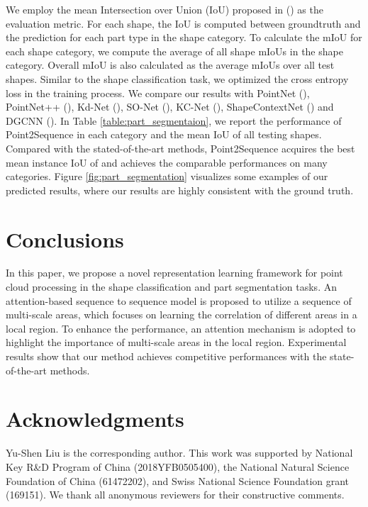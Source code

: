 \documentclass[letterpaper]{article}
\begin{document}
We employ the mean Intersection over Union (IoU) proposed in (\citealt{qi2017pointnet}) as the evaluation metric. 
For each shape, the IoU is computed between groundtruth and the prediction for each part type in the shape category.
To calculate the mIoU for each shape category, we compute the average of all shape mIoUs in the shape category.
Overall mIoU is also calculated as the average mIoUs over all test shapes.
Similar to the shape classification task, we optimized the cross entropy loss in the training process. 
We compare our results with PointNet (\citealt{qi2017pointnet}), PointNet++ (\citealt{qi2017pointnet++}), Kd-Net (\citealt{klokov2017escape}), SO-Net (\citealt{li2018so}), KC-Net (\citealt{shen2018mining}), ShapeContextNet (\citealt{xie2018attentional}) and DGCNN (\citealt{wang2018dynamic}).
In Table \ref{table:part_segmentaion}, we report the performance of Point2Sequence in each category and the mean IoU of all testing shapes.
Compared with the stated-of-the-art methods, Point2Sequence acquires the best mean instance IoU of  and achieves the comparable performances on many categories.
Figure \ref{fig:part_segmentation} visualizes some examples of our predicted results, where our results are highly consistent with the ground truth. 
\section{Conclusions}
In this paper, we propose a novel representation learning framework for point cloud processing in the shape classification and part segmentation tasks.
An attention-based sequence to sequence model is proposed to utilize a sequence of multi-scale areas, which focuses on learning the correlation of different areas in a local region. 
To enhance the performance, an attention mechanism is adopted to highlight the importance of multi-scale areas in the local region.
Experimental results show that our method achieves competitive performances with the state-of-the-art methods.

\section{Acknowledgments}
Yu-Shen Liu is the corresponding author. This work was supported by National Key R\&D Program of China (2018YFB0505400), the National Natural Science Foundation of China (61472202), and Swiss National Science Foundation grant (169151). We thank all anonymous reviewers for their constructive comments.



\end{document}
